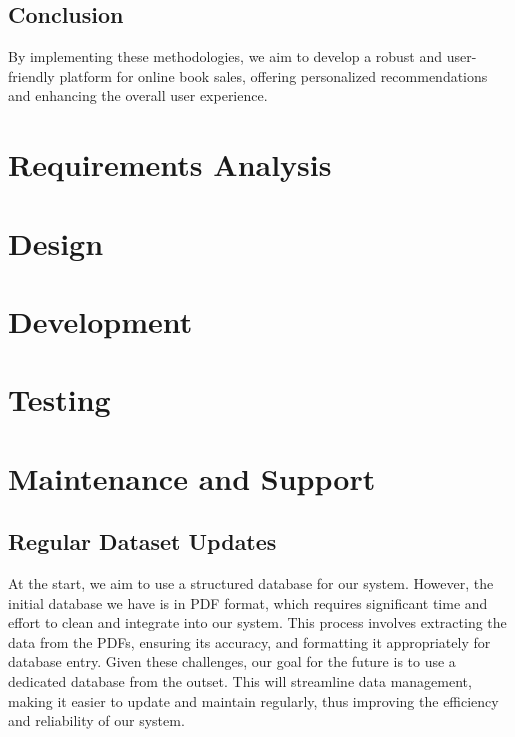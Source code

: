 \documentclass{article}
\begin{document}
\subsection{Conclusion}

By implementing these methodologies, we aim to develop a robust and user-friendly platform for online book sales, offering personalized recommendations and enhancing the overall user experience.


\section{Requirements Analysis}

\section{Design}

\section{Development}

\section{Testing}

\section{Maintenance and Support}

\subsection{Regular Dataset Updates}

At the start, we aim to use a structured database for our system. However, the initial database we have is in PDF format, which requires significant time and effort to clean and integrate into our system. This process involves extracting the data from the PDFs, ensuring its accuracy, and formatting it appropriately for database entry. Given these challenges, our goal for the future is to use a dedicated database from the outset. This will streamline data management, making it easier to update and maintain regularly, thus improving the efficiency and reliability of our system.
\end{document}
